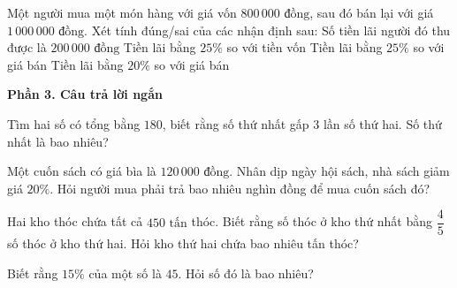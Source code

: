 \begin{ex} %
Một người mua một món hàng với giá vốn $800\,000\text{ đồng}$, sau đó bán lại với giá $1\,000\,000\text{ đồng}$. Xét tính đúng/sai của các nhận định sau:
\choiceTF
{\True Số tiền lãi người đó thu được là $200\,000\text{ đồng}$}
{\True Tiền lãi bằng $25\%$ so với tiền vốn}
{Tiền lãi bằng $25\%$ so với giá bán}
{\True Tiền lãi bằng $20\%$ so với giá bán}
\end{ex}

\textbf{Phần 3. Câu trả lời ngắn}

\begin{ex} %
Tìm hai số có tổng bằng $180$, biết rằng số thứ nhất gấp $3$ lần số thứ hai. Số thứ nhất là bao nhiêu?
\end{ex}

\begin{ex} %
Một cuốn sách có giá bìa là $120\,000\text{ đồng}$. Nhân dịp ngày hội sách, nhà sách giảm giá $20\%$. Hỏi người mua phải trả bao nhiêu nghìn đồng để mua cuốn sách đó?
\end{ex}

\begin{ex} %
Hai kho thóc chứa tất cả $450\text{ tấn}$ thóc. Biết rằng số thóc ở kho thứ nhất bằng $\dfrac{4}{5}$ số thóc ở kho thứ hai. Hỏi kho thứ hai chứa bao nhiêu tấn thóc?
\end{ex}

\begin{ex} %
Biết rằng $15\%$ của một số là $45$. Hỏi số đó là bao nhiêu?
\end{ex}

